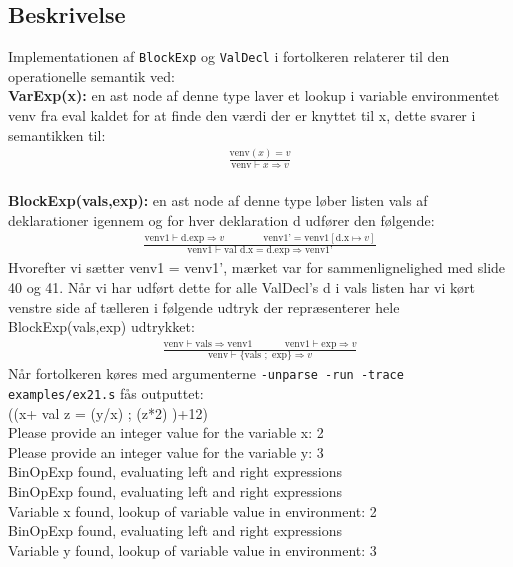 \documentclass[a1paper, 10pt]{article}
\theoremstyle{remark}
\begin{document}
\subsection*{Beskrivelse}
Implementationen af \texttt{BlockExp} og \texttt{ValDecl} i fortolkeren relaterer til den operationelle semantik ved: \\\textbf{VarExp(x):} en ast node af denne type laver et lookup i variable environmentet venv fra eval kaldet for at finde den værdi der er knyttet til x, dette svarer i semantikken til:
\begin{align*}
	\frac{\text{venv}(x)=v}{\text{venv}\vdash x \Rightarrow v}
\end{align*}
\\\textbf{BlockExp(vals,exp):} en ast node af denne type løber listen vals af deklarationer igennem og for hver deklaration d udfører den følgende:
\begin{align*}
	\frac{\text{venv1}\vdash \text{d.exp} \Rightarrow v \text{ }\text{ }\text{ }\text{ }\text{ }\text{ } \text{venv1'}=\text{venv1} [ \text{d.x}\mapsto v ] }{\text{venv1}\vdash \text{val d.x}=\text{d.exp}\Rightarrow\text{venv1'}}
\end{align*}
Hvorefter vi sætter venv1 = venv1', mærket var for sammenlignelighed med slide 40 og 41. Når vi har udført dette for alle ValDecl's d i vals listen har vi kørt venstre side af tælleren i følgende udtryk der repræsenterer hele BlockExp(vals,exp) udtrykket:
\begin{align*}
	\frac{\text{venv}\vdash \text{vals}\Rightarrow\text{venv1}\text{ }\text{ }\text{ }\text{ }\text{ }\text{venv1}\vdash \text{exp} \Rightarrow v}{\text{venv}\vdash\{\text{vals } ; \text{ exp} \}\Rightarrow v}
\end{align*}
Når fortolkeren køres med argumenterne \texttt{-unparse -run -trace examples/ex21.s} fås outputtet: \\
((x+{ val z = (y/x) ; (z*2) })+12)\\
Please provide an integer value for the variable x: 2\\
Please provide an integer value for the variable y: 3\\
BinOpExp found, evaluating left and right expressions\\
BinOpExp found, evaluating left and right expressions\\
Variable x found, lookup of variable value in environment: 2\\
BinOpExp found, evaluating left and right expressions\\
Variable y found, lookup of variable value in environment: 3\\
\end{document}
